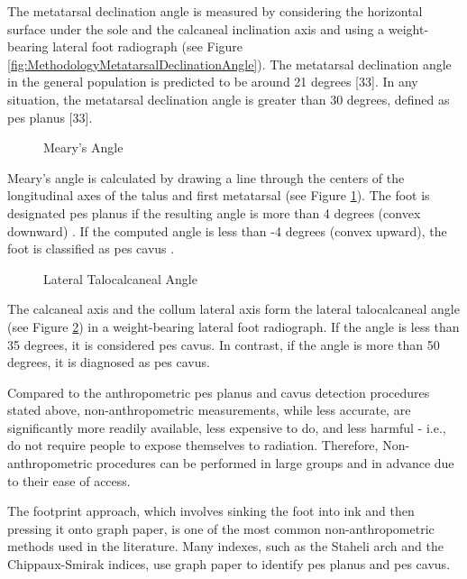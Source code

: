The metatarsal declination angle is measured by considering the horizontal surface under the sole and the calcaneal inclination axis and using a weight-bearing lateral foot radiograph (see Figure \ref{fig:MethodologyMetatarsalDeclinationAngle}). The metatarsal declination angle in the general population is predicted to be around 21 degrees [33]. In any situation, the metatarsal declination angle is greater than 30 degrees, defined as pes planus [33].

\begin{figure}[htbp]
\centering
{}
\caption{Meary's Angle \cite{radiopaediamearysangle}}
\label{fig:MethodologyMearysAngle}
\end{figure}

Meary's angle \cite{deniz2014ccocuklardaki} is calculated by drawing a line through the centers of the longitudinal axes of the talus and first metatarsal (see Figure \ref{fig:MethodologyMearysAngle}). The foot is designated pes planus if the resulting angle is more than 4 degrees (convex downward) \cite{vanderwilde1988measurements}. If the computed angle is less than -4 degrees (convex upward), the foot is classified as pes cavus \cite{banks2001mcglamry}.

\begin{figure}[htbp]
\centering
{}
\caption{Lateral Talocalcaneal Angle \cite{radiopaediamearysangle}}
\label{fig:MethodologyLateralTalocalcanealAngle}
\end{figure}

The calcaneal axis and the collum lateral axis form the lateral talocalcaneal angle (see Figure \ref{fig:MethodologyLateralTalocalcanealAngle}) in a weight-bearing lateral foot radiograph.  If the angle is less than 35 degrees, it is considered pes cavus.  In contrast, if the angle is more than 50 degrees, it is diagnosed as pes cavus.

Compared to the anthropometric pes planus and cavus detection procedures stated above, non-anthropometric measurements, while less accurate, are significantly more readily available, less expensive to do, and less harmful - i.e., do not require people to expose themselves to radiation. Therefore, Non-anthropometric procedures can be performed in large groups and in advance due to their ease of access.

The footprint approach, which involves sinking the foot into ink and then pressing it onto graph paper, is one of the most common non-anthropometric methods used in the literature. Many indexes, such as the Staheli arch and the Chippaux-Smirak indices, use graph paper to identify pes planus and pes cavus.

